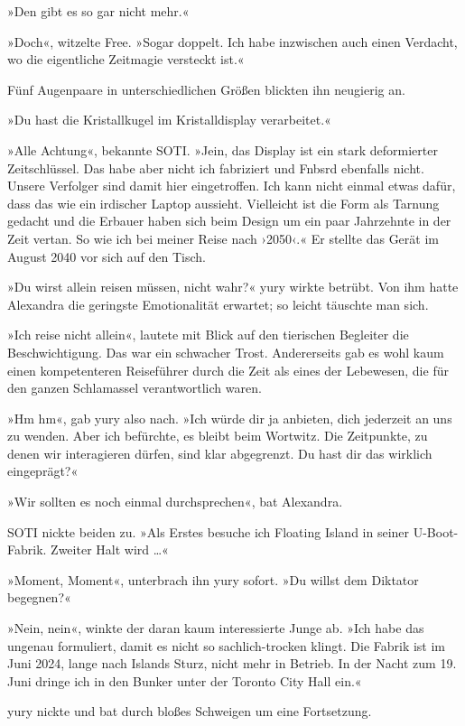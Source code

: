 »Den gibt es so gar nicht mehr.«

»Doch«, witzelte Free. »Sogar doppelt. Ich habe inzwischen auch einen Verdacht, wo die eigentliche Zeitmagie versteckt ist.«

Fünf Augenpaare in unterschiedlichen Größen blickten ihn neugierig an.

»Du hast die Kristallkugel im Kristalldisplay verarbeitet.«

»Alle Achtung«, bekannte SOTI. »Jein, das Display ist ein stark deformierter Zeitschlüssel. Das habe aber nicht ich fabriziert und Fnbsrd ebenfalls nicht. Unsere Verfolger sind damit hier eingetroffen. Ich kann nicht einmal etwas dafür, dass das wie ein irdischer Laptop aussieht. Vielleicht ist die Form als Tarnung gedacht und die Erbauer haben sich beim Design um ein paar Jahrzehnte in der Zeit vertan. So wie ich bei meiner Reise nach ›2050‹.« Er stellte das Gerät im August 2040 vor sich auf den Tisch.

»Du wirst allein reisen müssen, nicht wahr?« yury wirkte betrübt. Von ihm hatte Alexandra die geringste Emotionalität erwartet; so leicht täuschte man sich.

»Ich reise nicht allein«, lautete mit Blick auf den tierischen Begleiter die Beschwichtigung. Das war ein schwacher Trost. Andererseits gab es wohl kaum einen kompetenteren Reiseführer durch die Zeit als eines der Lebewesen, die für den ganzen Schlamassel verantwortlich waren.

»Hm hm«, gab yury also nach. »Ich würde dir ja anbieten, dich jederzeit an uns zu wenden. Aber ich befürchte, es bleibt beim Wortwitz. Die Zeitpunkte, zu denen wir interagieren dürfen, sind klar abgegrenzt. Du hast dir das wirklich eingeprägt?«

»Wir sollten es noch einmal durchsprechen«, bat Alexandra.

SOTI nickte beiden zu. »Als Erstes besuche ich Floating Island in seiner U-Boot-Fabrik. Zweiter Halt wird …«

»Moment, Moment«, unterbrach ihn yury sofort. »Du willst dem Diktator begegnen?«

»Nein, nein«, winkte der daran kaum interessierte Junge ab. »Ich habe das ungenau formuliert, damit es nicht so sachlich-trocken klingt. Die Fabrik ist im Juni 2024, lange nach Islands Sturz, nicht mehr in Betrieb. In der Nacht zum 19. Juni dringe ich in den Bunker unter der Toronto City Hall ein.«

yury nickte und bat durch bloßes Schweigen um eine Fortsetzung.

